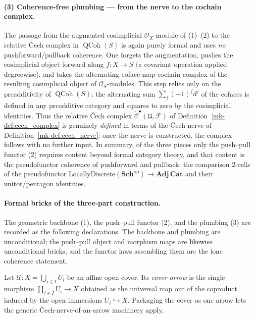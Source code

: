 \paragraph{(3) Coherence-free plumbing — from the nerve to the cochain complex.}
The passage from the augmented cosimplicial \(\mathcal{O}_X\)-module of (1)--(2)
to the relative {\v C}ech complex in \(\operatorname{QCoh}(S)\) is again purely
formal and uses \emph{no} pushforward/pullback coherence. One forgets the
augmentation, pushes the cosimplicial object forward along \(f : X \to S\) (a
covariant operation applied degreewise), and takes the alternating-coface-map
cochain complex of the resulting cosimplicial object of \(\mathcal{O}_S\)-modules.
This step relies only on the preadditivity of \(\operatorname{QCoh}(S)\): the
alternating sum \(\sum_{j} (-1)^j d^j\) of the cofaces is defined in any
preadditive category and squares to zero by the cosimplicial identities. Thus the
relative {\v C}ech complex \(\check{\mathcal{C}}^\bullet(\mathfrak{U}, \mathcal{F})\)
of Definition~\ref{mk-def:cech_complex} is genuinely \emph{defined} in terms of the
{\v C}ech nerve of Definition~\ref{mk-def:cech_nerve}: once the nerve is constructed,
the complex follows with no further input. In summary, of the three pieces only
the push--pull functor (2) requires content beyond formal category theory, and
that content is the pseudofunctor coherence of pushforward and pullback: the
comparison \(2\)-cells of the pseudofunctor
\(\mathrm{LocallyDiscrete}(\mathbf{Sch}^{\mathrm{op}}) \to \mathbf{Adj}\,\mathbf{Cat}\)
and their unitor/pentagon identities.

\paragraph{Formal bricks of the three-part construction.}
The geometric backbone (1), the push--pull functor (2), and the plumbing (3) are
recorded as the following declarations. The backbone and plumbing are
unconditional; the push--pull object and morphism maps are likewise unconditional
bricks, and the functor laws assembling them are the lone coherence statement.

\begin{definition}\label{mk-def:cover_arrow}
  \leanok

  Let \(\mathcal{U} : X = \bigcup_{i \in I} U_i\) be an affine open cover. Its
  \emph{cover arrow} is the single morphism
  \(\coprod_{i \in I} U_i \longrightarrow X\) obtained as the universal map out of
  the coproduct induced by the open immersions \(U_i \hookrightarrow X\). Packaging
  the cover as one arrow lets the generic {\v C}ech-nerve-of-an-arrow machinery
  apply.
\end{definition}

